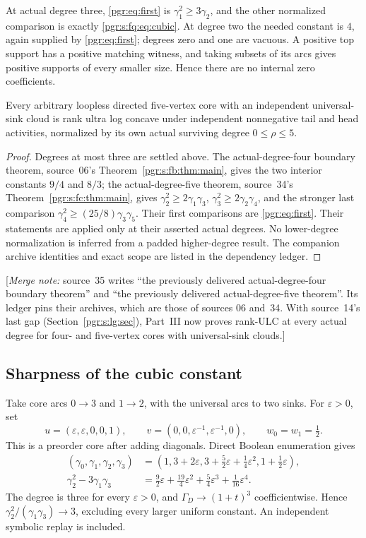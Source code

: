 \documentclass[11pt]{article}
\numberwithin{equation}{section}
\theoremstyle{definition}\newtheorem{definition}[theorem]{Definition}\newtheorem{remark}[theorem]{Remark}
\newcommand{\mnote}[1]{[\textit{Merge note:} #1]}
\begin{document}
At actual degree three, \eqref{pgr:eq:first} is $\gamma_1^2\ge3\gamma_2$, and the other normalized comparison is exactly \eqref{pgr:s:fq:eq:cubic}. At degree two the needed constant is $4$, again supplied by \eqref{pgr:eq:first}; degrees zero and one are vacuous. A positive top support has a positive matching witness, and taking subsets of its arcs gives positive supports of every smaller size. Hence there are no internal zero coefficients.

\begin{corollary}\label{pgr:s:fq:cor:all}
Every arbitrary loopless directed five-vertex core with an independent universal-sink cloud is rank ultra log concave under independent nonnegative tail and head activities, normalized by its own actual surviving degree $0\le\rho\le5$.
\end{corollary}
\begin{proof}
Degrees at most three are settled above. The actual-degree-four boundary theorem, source~06's Theorem~\ref{pgr:s:fb:thm:main}, gives the two interior constants $9/4$ and $8/3$; the actual-degree-five theorem, source~34's Theorem~\ref{pgr:s:fc:thm:main}, gives $\gamma_2^2\ge2\gamma_1\gamma_3$, $\gamma_3^2\ge2\gamma_2\gamma_4$, and the stronger last comparison $\gamma_4^2\ge(25/8)\gamma_3\gamma_5$. Their first comparisons are \eqref{pgr:eq:first}. Their statements are applied only at their asserted actual degrees. No lower-degree normalization is inferred from a padded higher-degree result. The companion archive identities and exact scope are listed in the dependency ledger.
\end{proof}
\mnote{source~35 writes ``the previously delivered actual-degree-four
boundary theorem'' and ``the previously delivered actual-degree-five
theorem''. Its ledger pins their archives, which are those of sources 06
and~34. With source~14's last gap (Section~\ref{pgr:s:lg:sec}), Part~III
now proves rank-ULC at every actual degree for four- and five-vertex cores
with universal-sink clouds.}

\subsection{Sharpness of the cubic constant}
Take core arcs $0\to3$ and $1\to2$, with the universal arcs to two sinks. For $\varepsilon>0$, set
\[
 u=(\varepsilon,\varepsilon,0,0,1),\qquad
 v=(0,0,\varepsilon^{-1},\varepsilon^{-1},0),\qquad
 w_0=w_1=\tfrac12.
\]
This is a preorder core after adding diagonals. Direct Boolean enumeration gives
\begin{align*}
 (\gamma_0,\gamma_1,\gamma_2,\gamma_3)
 &=\left(1,3+2\varepsilon,
 3+\tfrac52\varepsilon+\tfrac14\varepsilon^2,
 1+\tfrac12\varepsilon\right),\\
 \gamma_2^2-3\gamma_1\gamma_3
 &=\tfrac92\varepsilon+\tfrac{19}4\varepsilon^2
  +\tfrac54\varepsilon^3+\tfrac1{16}\varepsilon^4.
\end{align*}
The degree is three for every $\varepsilon>0$, and $\Gamma_D\to(1+t)^3$ coefficientwise. Hence $\gamma_2^2/(\gamma_1\gamma_3)\to3$, excluding every larger uniform constant. An independent symbolic replay is included.
\end{document}
